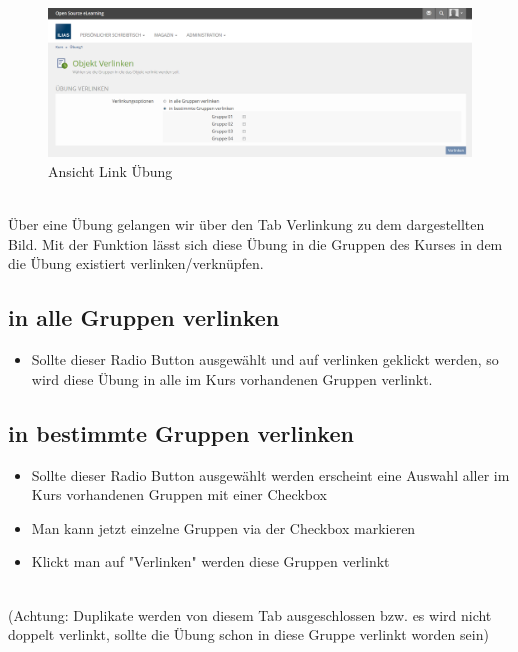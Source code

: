 \begin{figure}[h!]
	\centering
	\includegraphics[width=1\textwidth]{img/linkUebung.png}
	\caption{Ansicht Link Übung}
\end{figure}

~\\Über eine Übung gelangen wir über den Tab Verlinkung zu dem dargestellten Bild. 
Mit der Funktion lässt sich diese Übung in die Gruppen des Kurses in dem die Übung existiert verlinken/verknüpfen. 
\newpage
\subsection*{in alle Gruppen verlinken}
\begin{itemize}
	\item Sollte dieser Radio Button ausgewählt und auf verlinken geklickt werden, so wird diese Übung in alle im Kurs vorhandenen Gruppen verlinkt. 
\end{itemize}

\subsection*{in bestimmte Gruppen verlinken}
\begin{itemize}
	\item Sollte dieser Radio Button ausgewählt werden erscheint eine Auswahl aller im Kurs vorhandenen Gruppen mit einer Checkbox
	\item Man kann jetzt einzelne Gruppen via der Checkbox markieren
	\item Klickt man auf "Verlinken" werden diese Gruppen verlinkt
\end{itemize}

~\\(Achtung: Duplikate werden von diesem Tab ausgeschlossen bzw. es wird nicht doppelt verlinkt, sollte die Übung schon in diese Gruppe verlinkt worden sein) 
\clearpage